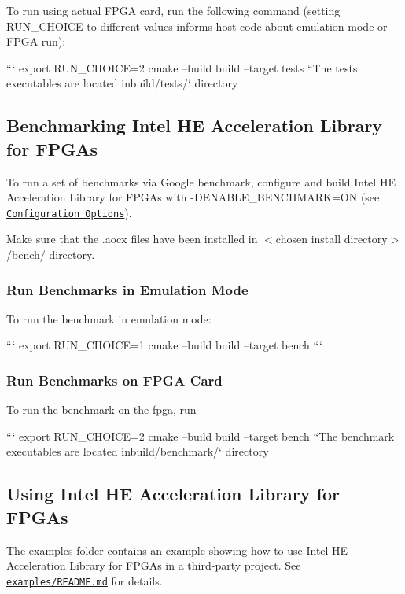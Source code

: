 To run using actual F\-P\-G\-A card, run the following command (setting R\-U\-N\-\_\-\-C\-H\-O\-I\-C\-E to different values informs host code about emulation mode or F\-P\-G\-A run)\-: \par


``` export R\-U\-N\-\_\-\-C\-H\-O\-I\-C\-E=2 cmake --build build --target tests ``{\ttfamily  The tests executables are located in}build/tests/` directory \par


\subsection*{Benchmarking Intel H\-E Acceleration Library for F\-P\-G\-As}

To run a set of benchmarks via Google benchmark, configure and build Intel H\-E Acceleration Library for F\-P\-G\-As with {\ttfamily -\/\-D\-E\-N\-A\-B\-L\-E\-\_\-\-B\-E\-N\-C\-H\-M\-A\-R\-K=O\-N} (see \href{#configuration-options}{\tt Configuration Options}). \par
 Make sure that the .aocx files have been installed in {\ttfamily $<$chosen install directory$>$/bench/} directory. \par


\subsubsection*{Run Benchmarks in Emulation Mode}

To run the benchmark in emulation mode\-: \par
 ``` export R\-U\-N\-\_\-\-C\-H\-O\-I\-C\-E=1 cmake --build build --target bench ``` \subsubsection*{Run Benchmarks on F\-P\-G\-A Card}

To run the benchmark on the fpga, run \par
 ``` export R\-U\-N\-\_\-\-C\-H\-O\-I\-C\-E=2 cmake --build build --target bench ``{\ttfamily  The benchmark executables are located in}build/benchmark/` directory \par


\subsection*{Using Intel H\-E Acceleration Library for F\-P\-G\-As}

The {\ttfamily examples} folder contains an example showing how to use Intel H\-E Acceleration Library for F\-P\-G\-As in a third-\/party project. See \href{examples/README.md}{\tt examples/\-R\-E\-A\-D\-M\-E.\-md} for details. \par


